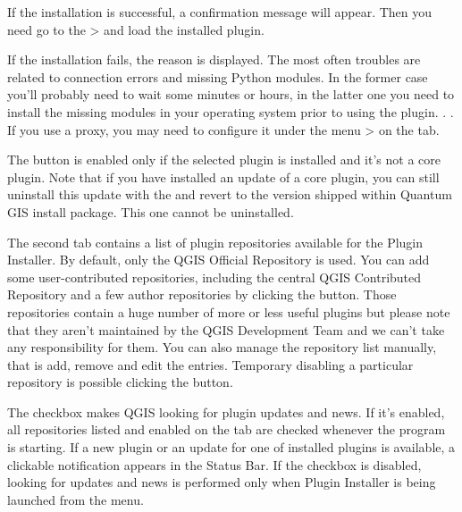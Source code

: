 If the installation is successful, a confirmation message will appear. Then you need go to the  >  and load the installed plugin. 

If the installation fails, the reason is displayed. The most often troubles are related to connection errors and missing Python modules. In the former case you'll probably need to wait some minutes or hours, in the latter one you need to install the missing modules in your operating system prior to using the plugin. . . If you use a proxy, you may need to configure it under the menu  >  on the  tab.

The  button is enabled only if the selected plugin is installed and it's not a core plugin. Note that if you have installed an update of a core plugin, you can still uninstall this update with the  and revert to the version shipped within Quantum GIS install package. This one cannot be uninstalled.


The second tab  contains a list of plugin repositories available for the Plugin Installer. By default, only the QGIS Official Repository is used. You can add some user-contributed repositories, including the central QGIS Contributed Repository and a few author repositories by clicking the  button. Those repositories contain a huge number of more or less useful plugins but please note that they aren't maintained by the QGIS Development Team and we can't take any responsibility for them. You can also manage the repository list manually, that is add, remove and edit the entries. Temporary disabling a particular repository is possible clicking the  button.

The  checkbox makes QGIS looking for plugin updates and news. If it's enabled, all repositories listed and enabled on the  tab are checked whenever the program is starting. If a new plugin or an update for one of installed plugins is available, a clickable notification appears in the Status Bar. If the checkbox is disabled, looking for updates and news is performed only when Plugin Installer is being launched from the menu.

